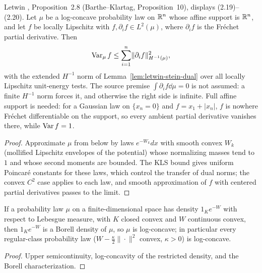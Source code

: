 \begin{theorem}
  \label{thm:letwin-h-minus-one-variance}
  \leanok
  Letwin \cite{Letwin2026QuadraticKLS}, Proposition~2.8 (Barthe--Klartag, Proposition~10), displays (2.19)--(2.20).
  Let $\mu$ be a log-concave probability law on $\mathbb{R}^n$ whose affine support is $\mathbb{R}^n$, and let $f$ be locally
  Lipschitz with $f,\partial_if\in L^2(\mu)$, where $\partial_if$ is the Fr\'echet partial derivative. Then
  \[
    \operatorname{Var}_\mu f\le\sum_{i=1}^n\lVert\partial_if\rVert_{H^{-1}(\mu)}^2,
  \]
  with the extended $H^{-1}$ norm of Lemma~\ref{lem:letwin-stein-dual} over all locally Lipschitz unit-energy tests.
  The source premise $\int\partial_if\dd\mu=0$ is not assumed: a finite $H^{-1}$ norm forces it, and otherwise the
  right side is infinite. Full affine support is needed: for a Gaussian law on $\{x_n=0\}$ and $f=x_1+|x_n|$, $f$ is
  nowhere Fr\'echet differentiable on the support, so every ambient partial derivative vanishes there, while
  $\operatorname{Var} f=1$.
\end{theorem}
\begin{proof}
  \leanok
  Approximate $\mu$ from below by laws $e^{-W_k}dx$ with smooth convex $W_k$ (mollified Lipschitz envelopes of the
  potential) whose normalizing masses tend to $1$ and whose second moments are bounded. The KLS bound gives uniform
  Poincar\'e constants for these laws, which control the transfer of dual norms; the convex $C^2$ case applies to
  each law, and smooth approximation of $f$ with centered partial derivatives passes to the limit.
\end{proof}

\begin{lemma}
  \label{lem:restricted-exp-logconcave}
  \leanok
  If a probability law $\mu$ on a finite-dimensional space has density $1_Ke^{-W}$ with respect to Lebesgue measure,
  with $K$ closed convex and $W$ continuous convex, then $1_Ke^{-W}$ is a Borell density of $\mu$, so $\mu$ is
  log-concave; in particular every regular-class probability law ($W-\tfrac\kappa2\|\cdot\|^2$ convex, $\kappa>0$) is
  log-concave.
\end{lemma}
\begin{proof}
  \leanok
  Upper semicontinuity, log-concavity of the restricted density, and the Borell characterization.
\end{proof}

